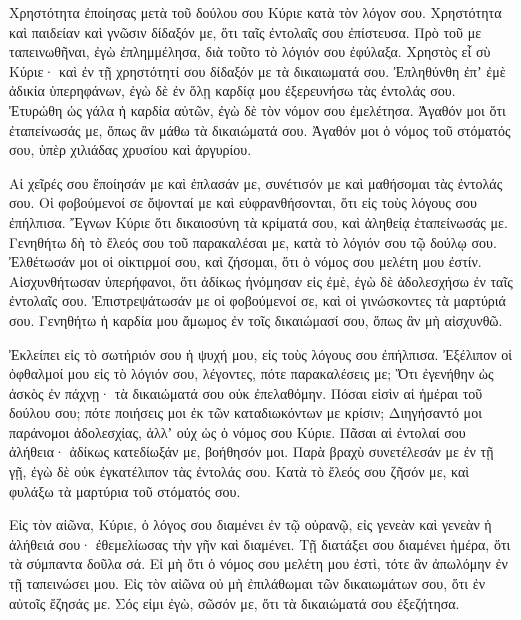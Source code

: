 {\par }{\PP {}Χρηστότητα ἐποίησας μετὰ τοῦ δούλου σου Κύριε κατὰ τὸν λόγον σου.
Χρηστότητα καὶ παιδείαν καὶ γνῶσιν δίδαξόν με, ὅτι ταῖς ἐντολαῖς σου ἐπίστευσα.
Πρὸ τοῦ με ταπεινωθῆναι, ἐγὼ ἐπλημμέλησα, διὰ τοῦτο τὸ λόγιόν σου ἐφύλαξα.
Χρηστὸς εἶ σὺ Κύριε· καὶ ἐν τῇ χρηστότητί σου δίδαξόν με τὰ δικαιωματά σου.
Ἐπληθύνθη ἐπʼ ἐμὲ ἀδικία ὑπερηφάνων, ἐγὼ δὲ ἐν ὅλῃ καρδίᾳ μου ἐξερευνήσω τὰς ἐντολάς σου.
Ἐτυρώθη ὡς γάλα ἡ καρδία αὐτῶν, ἐγὼ δὲ τὸν νόμον σου ἐμελέτησα.
Ἀγαθόν μοι ὅτι ἐταπείνωσάς με, ὅπως ἂν μάθω τὰ δικαιώματά σου.
Ἀγαθόν μοι ὁ νόμος τοῦ στόματός σου, ὑπὲρ χιλιάδας χρυσίου καὶ ἀργυρίου.
\par }{\PP {}Αἱ χεῖρές σου ἔποίησάν με καὶ ἐπλασάν με, συνέτισόν με καὶ μαθήσομαι τὰς ἐντολάς σου.
Οἱ φοβούμενοί σε ὄψονταί με καὶ εὐφρανθήσονται, ὅτι εἰς τοὺς λόγους σου ἐπήλπισα.
Ἔγνων Κύριε ὅτι δικαιοσύνη τὰ κρίματά σου, καὶ ἀληθείᾳ ἐταπείνωσάς με.
Γενηθήτω δὴ τὸ ἔλεός σου τοῦ παρακαλέσαι με, κατὰ τὸ λόγιόν σου τῷ δούλῳ σου.
Ἐλθέτωσάν μοι οἱ οἰκτιρμοί σου, καὶ ζήσομαι, ὅτι ὁ νόμος σου μελέτη μου ἐστίν.
Αἰσχυνθήτωσαν ὑπερήφανοι, ὅτι ἀδίκως ἠνόμησαν εἰς ἐμὲ, ἐγὼ δὲ ἀδολεσχήσω ἐν ταῖς ἐντολαῖς σου.
Ἐπιστρεψάτωσάν με οἱ φοβούμενοί σε, καὶ οἱ γινώσκοντες τὰ μαρτύριά σου.
Γενηθήτω ἡ καρδία μου ἄμωμος ἐν τοῖς δικαιώμασί σου, ὅπως ἂν μὴ αἰσχυνθῶ.
\par }{\PP {}Ἐκλείπει εἰς τὸ σωτήριόν σου ἡ ψυχή μου, εἰς τοὺς λόγους σου ἐπήλπισα.
Ἐξέλιπον οἱ ὀφθαλμοί μου εἰς τὸ λόγιόν σου, λέγοντες, πότε παρακαλέσεις με;
Ὅτι ἐγενήθην ὡς ἀσκὸς ἐν πάχνῃ· τὰ δικαιώματά σου οὐκ ἐπελαθόμην.
Πόσαι εἰσὶν αἱ ἡμέραι τοῦ δούλου σου; πότε ποιήσεις μοι ἐκ τῶν καταδιωκόντων με κρίσιν;
Διηγήσαντό μοι παράνομοι ἀδολεσχίας, ἀλλʼ οὐχ ὡς ὁ νόμος σου Κύριε.
Πᾶσαι αἱ ἐντολαί σου ἀλήθεια· ἀδίκως κατεδίωξάν με, βοήθησόν μοι.
Παρὰ βραχὺ συνετέλεσάν με ἐν τῇ γῇ, ἐγὼ δὲ οὐκ ἐγκατέλιπον τὰς ἐντολάς σου.
Κατὰ τὸ ἔλεός σου ζῆσόν με, καὶ φυλάξω τὰ μαρτύρια τοῦ στόματός σου.
\par }{\PP {}Εἰς τὸν αἰῶνα, Κύριε, ὁ λόγος σου διαμένει ἐν τῷ οὐρανῷ,
εἰς γενεὰν καὶ γενεὰν ἡ ἀλήθειά σου· ἐθεμελίωσας τὴν γῆν καὶ διαμένει.
Τῇ διατάξει σου διαμένει ἡμέρα, ὅτι τὰ σύμπαντα δοῦλα σά.
Εἰ μὴ ὅτι ὁ νόμος σου μελέτη μου ἐστὶ, τότε ἂν ἀπωλόμην ἐν τῇ ταπεινώσει μου.
Εἰς τὸν αἰῶνα οὐ μὴ ἐπιλάθωμαι τῶν δικαιωμάτων σου, ὅτι ἐν αὐτοῖς ἔζησάς με.
Σός εἰμι ἐγὼ, σῶσόν με, ὅτι τὰ δικαιώματά σου ἐξεζήτησα.
}
